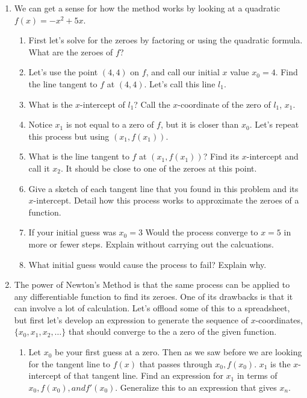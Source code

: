 \documentclass{amsbook}
\begin{document}
\begin{enumerate}
    	\item We can get a sense for how the method works by looking at a quadratic $f(x)=-x^2+5x$.
    		\begin{enumerate}
    			\item First let's solve for the zeroes by factoring or using the quadratic formula. What are the zeroes of $f$?\\
    			\item Let's use the point $(4, 4)$ on $f$, and call our initial $x$ value  $x_0=4$. Find the line tangent to $f$ at $(4,4)$. Let's call this line $l_1$.\\
    			\item What is the $x$-intercept of $l_1$? Call the $x$-coordinate of the zero of $l_1$, $x_1$.\\
    			\item Notice $x_1$ is not equal to a zero of $f$, but it is closer than $x_0$. Let's repeat this process but using $(x_1,f(x_1))$.\\
    			\item What is the line tangent to $f$ at $(x_1,f(x_1))$? Find its $x$-intercept and call it $x_2$. It should be close to one of the zeroes at this point. \\
    			\item Give a sketch of each tangent line that you found in this problem and its $x$-intercept. Detail how this process works to approximate the zeroes of a function.\\
    			\item If your initial guess was $x_0=3$ Would the process converge to $x=5$ in more or fewer steps. Explain without carrying out the calcuations.\\
    			\item What initial guess would cause the process to fail? Explain why.\\
    		\end{enumerate}
    	\item The power of Newton's Method is that the same process can be applied to any differentiable function to find its zeroes.  One of its drawbacks is that it can involve a lot of calculation. Let's offload some of this to a spreadsheet, but first let's develop an expression to generate the sequence of $x$-coordinates, $\{x_0,x_1,x_2,\dots\}$ that should converge to the a zero of the given function.\\
    		\begin{enumerate}
    			\item Let $x_0$ be your first guess at a zero. Then as we saw before we are looking for the tangent line to $f(x)$ that passes through $x_0, f(x_0)$.  $x_1$ is the $x$-intercept of that tangent line. Find an expression for $x_1$ in terms of $x_0,f(x_0), and f'(x_0)$.  Generalize this to an expression that gives $x_n$.\\

\end{enumerate}
\end{enumerate}
\end{document}
